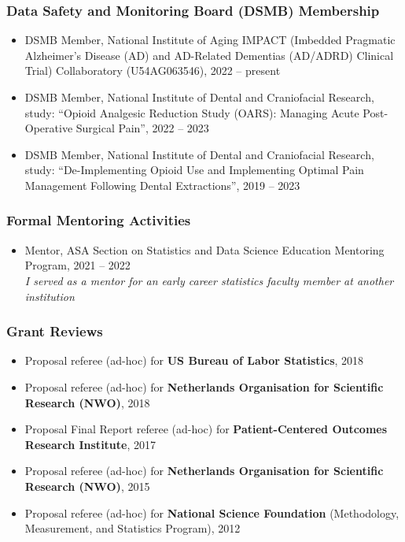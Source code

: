 \documentclass[
  english,
  letterpaper,
  DIV=11,
  numbers=noendperiod]{scrartcl}
\providecommand{\tightlist}{%
  \setlength{\itemsep}{0pt}\setlength{\parskip}{0pt}}
\begin{document}
\subsubsection{Data Safety and Monitoring Board (DSMB)
Membership}\label{data-safety-and-monitoring-board-dsmb-membership}

\begin{itemize}
\tightlist
\item
  DSMB Member, National Institute of Aging IMPACT (Imbedded Pragmatic
  Alzheimer's Disease (AD) and AD-Related Dementias (AD/ADRD) Clinical
  Trial) Collaboratory (U54AG063546), 2022 -- present\\
\item
  DSMB Member, National Institute of Dental and Craniofacial Research,
  study: ``Opioid Analgesic Reduction Study (OARS): Managing Acute
  Post-Operative Surgical Pain'', 2022 -- 2023\\
\item
  DSMB Member, National Institute of Dental and Craniofacial Research,
  study: ``De-Implementing Opioid Use and Implementing Optimal Pain
  Management Following Dental Extractions'', 2019 -- 2023
\end{itemize}

\subsubsection{Formal Mentoring
Activities}\label{formal-mentoring-activities}

\begin{itemize}
\tightlist
\item
  Mentor, ASA Section on Statistics and Data Science Education Mentoring
  Program, 2021 -- 2022\\
  \emph{I served as a mentor for an early career statistics faculty
  member at another institution}
\end{itemize}

\subsubsection{Grant Reviews}\label{grant-reviews}

\begin{itemize}
\tightlist
\item
  Proposal referee (ad-hoc) for \textbf{US Bureau of Labor Statistics},
  2018
\item
  Proposal referee (ad-hoc) for \textbf{Netherlands Organisation for
  Scientific Research (NWO)}, 2018
\item
  Proposal Final Report referee (ad-hoc) for \textbf{Patient-Centered
  Outcomes Research Institute}, 2017
\item
  Proposal referee (ad-hoc) for \textbf{Netherlands Organisation for
  Scientific Research (NWO)}, 2015
\item
  Proposal referee (ad-hoc) for \textbf{National Science Foundation}
  (Methodology, Measurement, and Statistics Program), 2012
\end{itemize}
\end{document}
